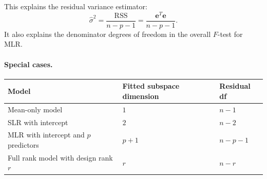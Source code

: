 This explains the residual variance estimator:
\begin{equation}
  \widehat{\sigma}^2
  =\frac{\text{RSS}}{n-p-1}
  =\frac{\mathbf{e}^T\mathbf{e}}{n-p-1}.
\end{equation}
It also explains the denominator degrees of freedom in the overall \(F\)-test for MLR.

\paragraph{Special cases.}
\begin{center}
\begin{tabular}{|p{}|p{}|p{}|}
\hline
\textbf{Model} & \textbf{Fitted subspace dimension} & \textbf{Residual df} \\
\hline
Mean-only model & \(1\) & \(n-1\) \\
\hline
SLR with intercept & \(2\) & \(n-2\) \\
\hline
MLR with intercept and \(p\) predictors & \(p+1\) & \(n-p-1\) \\
\hline
Full rank model with design rank \(r\) & \(r\) & \(n-r\) \\
\hline
\end{tabular}
\end{center}

